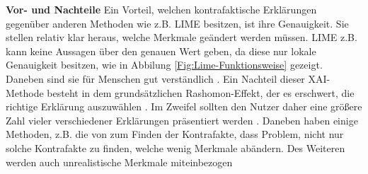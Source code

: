 \textbf{Vor- und Nachteile}
Ein Vorteil, welchen kontrafaktische Erklärungen gegenüber anderen Methoden wie z.B. LIME besitzen, ist ihre Genauigkeit. Sie stellen relativ klar heraus, welche Merkmale geändert werden müssen. LIME z.B. kann keine Aussagen über den genauen Wert geben, da diese nur lokale Genauigkeit besitzen, wie in Abbilung \ref{Fig:Lime-Funktionsweise} gezeigt. Daneben sind sie für Menschen gut verständlich \cite{molnar2022}. Ein Nachteil dieser XAI-Methode besteht in dem grundsätzlichen Rashomon-Effekt, der es erschwert, die richtige Erklärung auszuwählen \cite{kamath2021explainable}. Im Zweifel sollten den Nutzer daher eine größere Zahl vieler verschiedener Erklärungen präsentiert werden \cite{molnar2022}. Daneben haben einige Methoden, z.B. die von \cite{wachter2017counterfactual} zum Finden der Kontrafakte, dass Problem, nicht nur solche Kontrafakte zu finden, welche wenig Merkmale abändern. Des Weiteren werden auch unrealistische Merkmale miteinbezogen \cite{molnar2022}

